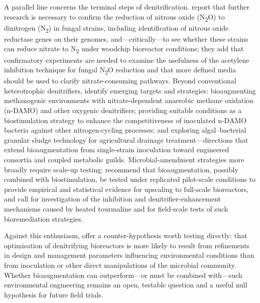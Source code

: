 \documentclass[11pt]{article}
\begin{document}
A parallel line concerns the terminal steps of denitrification. \textcite{Aldossari2021} report that further research is necessary to confirm the reduction of nitrous oxide (N\textsubscript{2}O) to dinitrogen (N\textsubscript{2}) in fungal strains, including identification of nitrous oxide reductase genes on their genomes, and---critically---to see whether these strains can reduce nitrate to N\textsubscript{2} under woodchip bioreactor conditions; they add that confirmatory experiments are needed to examine the usefulness of the acetylene inhibition technique for fungal N\textsubscript{2}O reduction and that more defined media should be used to clarify nitrate-consuming pathways. Beyond conventional heterotrophic denitrifiers, \textcite{Wang2025b} identify emerging targets and strategies: bioaugmenting methanogenic environments with nitrate-dependent anaerobic methane oxidation (n-DAMO) and other oxygenic denitrifiers; providing suitable conditions as a biostimulation strategy to enhance the competitiveness of inoculated n-DAMO bacteria against other nitrogen-cycling processes; and exploring algal--bacterial granular sludge technology for agricultural drainage treatment---directions that extend bioaugmentation from single-strain inoculation toward engineered consortia and coupled metabolic guilds. Microbial-amendment strategies more broadly require scale-up testing: \textcite{Jeglot2022} recommend that bioaugmentation, possibly combined with biostimulation, be tested under replicated pilot-scale conditions to provide empirical and statistical evidence for upscaling to full-scale bioreactors, and \textcite{Ma2021} call for investigation of the inhibition and denitrifier-enhancement mechanisms caused by heated tourmaline and for field-scale tests of such bioremediation strategies.

Against this enthusiasm, \textcite{Hathaway2015} offer a counter-hypothesis worth testing directly: that optimisation of denitrifying bioreactors is more likely to result from refinements in design and management parameters influencing environmental conditions than from inoculation or other direct manipulations of the microbial community. Whether bioaugmentation can outperform---or must be combined with---such environmental engineering remains an open, testable question and a useful null hypothesis for future field trials.
\end{document}
